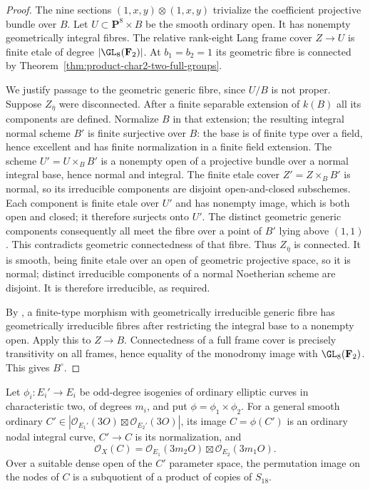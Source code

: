 \begin{proof}
The nine sections $(1,x,y)\otimes(1,x,y)$ trivialize the
coefficient projective bundle over $B$.
Let $U\subset\mathbf P^8\times B$ be the smooth ordinary open.
It has nonempty geometrically integral fibres.
The relative rank-eight Lang frame cover $Z\to U$ is finite
etale of degree $|\GL_8(\mathbf F_2)|$.
At $b_1=b_2=1$ its geometric fibre is connected by
Theorem~\ref{thm:product-char2-two-full-groups}.

We justify passage to the geometric generic fibre, since $U/B$
is not proper. Suppose $Z_{\bar\eta}$ were disconnected.
After a finite separable extension of $k(B)$ all its components
are defined. Normalize $B$ in that extension; the resulting
integral normal scheme $B'$ is finite surjective over $B$: the
base is of finite type over a field, hence excellent and has
finite normalization in a finite field extension.
The scheme $U'=U\times_B B'$ is a nonempty open of a projective
bundle over a normal integral base, hence normal and integral.
The finite etale cover $Z'=Z\times_B B'$ is normal, so its
irreducible components are disjoint open-and-closed subschemes.
Each component is finite etale over $U'$ and has nonempty image,
which is both open and closed; it therefore surjects onto $U'$.
The distinct geometric generic components consequently all
meet the fibre over a point of $B'$ lying above $(1,1)$.
This contradicts geometric connectedness of that fibre.
Thus $Z_{\bar\eta}$ is connected. It is smooth, being finite
etale over an open of geometric projective space, so it is
normal; distinct irreducible components of a normal Noetherian
scheme are disjoint. It is therefore irreducible, as required.

By \cite[Lemma~37.27.5]{Stacks0559}, a finite-type morphism with
geometrically irreducible generic fibre has geometrically
irreducible fibres after restricting the integral base to a
nonempty open. Apply this to $Z\to B$.
Connectedness of a full frame cover is precisely transitivity
on all frames, hence equality of the monodromy image with
$\GL_8(\mathbf F_2)$. This gives $B^\circ$.
\end{proof}

\begin{lemma}
\label{lem:ordinary-product-isogeny-nodal-images}
Let $\phi_i:E_i'\to E_i$ be odd-degree isogenies of ordinary
elliptic curves in characteristic two, of degrees $m_i$, and
put $\phi=\phi_1\times\phi_2$.
For a general smooth ordinary
$C'\in|\mathcal O_{E_1'}(3O)\boxtimes\mathcal O_{E_2'}(3O)|$,
its image $C=\phi(C')$ is an ordinary nodal integral curve,
$C'\to C$ is its normalization, and
\[
 \mathcal O_X(C)=
 \mathcal O_{E_1}(3m_2O)\boxtimes\mathcal O_{E_2}(3m_1O).
\]
Over a suitable dense open of the $C'$ parameter space, the
permutation image on the nodes of $C$ is a subquotient of a
product of copies of $S_{18}$.
\end{lemma}

